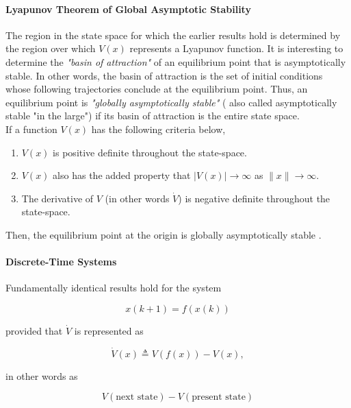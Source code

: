 \documentclass{thesisreport}
\begin{document}
\paragraph{Lyapunov Theorem of Global Asymptotic Stability}

The region in the state space for which the earlier results hold is determined by the region over which $V(x)$ represents a Lyapunov function. It is interesting to determine the \textit{"basin of attraction"} of an equilibrium point that is asymptotically stable. In other words, the basin of attraction is the set of initial conditions whose following trajectories conclude at the equilibrium point. Thus, an equilibrium point is \textit{"globally asymptotically stable"} ( also called asymptotically stable "in the large") if its basin of attraction is the entire state space.\\

\noindent
If a function $V(x)$ has the following criteria below, 

\begin{enumerate}
	\item $V(x)$ is positive definite throughout the state-space.
	\item $V(x)$ also has the added property that $|V(x)| \rightarrow \infty$ as $\|x\| \rightarrow \infty$.
	\item The derivative of $V$ (in other words $\dot{V}$) is negative definite throughout the state-space.
\end{enumerate}
Then, the equilibrium point at the origin is globally asymptotically stable \cite{Dahleh2011}.

\paragraph{Discrete-Time Systems}

Fundamentally identical results hold for the system

\begin{equation}
x(k+1) = f(x(k))
\end{equation}

provided that $\dot{V}$ is represented as

\begin{equation*}
\dot{V}(x) \triangleq V(f(x)) - V(x),
\end{equation*}

in other words as 

\begin{equation*}
V(\text{next state}) - V(\text{present state})
\end{equation*}
\end{document}
